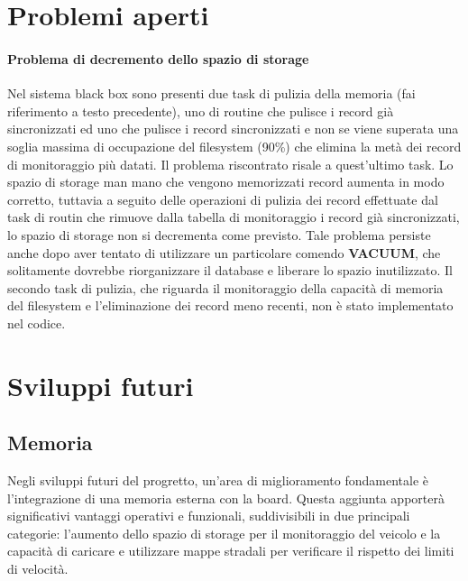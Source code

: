 \documentclass[12pt, a4paper, italian]{report}
\numberwithin{figure}{chapter}
\numberwithin{table}{chapter}
\begin{document}
\section{Problemi aperti}
\paragraph{Problema di decremento dello spazio di storage}
Nel sistema black box sono presenti due task di pulizia della memoria (fai riferimento a testo precedente), uno di routine che pulisce i record già sincronizzati ed uno che pulisce i record sincronizzati e non se viene superata una soglia massima di occupazione del filesystem (90\%) che elimina la metà dei record di monitoraggio più datati. Il problema riscontrato risale a quest'ultimo task. Lo spazio di storage man mano che vengono memorizzati record aumenta in modo corretto, tuttavia a seguito delle operazioni di pulizia dei record effettuate dal task di routin che rimuove dalla tabella di monitoraggio i record già sincronizzati, lo spazio di storage non si decrementa come previsto. Tale problema persiste anche dopo aver tentato di utilizzare un particolare comendo \textbf{VACUUM}, che solitamente dovrebbe riorganizzare il database e liberare lo spazio inutilizzato. 
Il secondo task di pulizia, che riguarda il monitoraggio della capacità di memoria del filesystem e l'eliminazione dei record meno recenti, non è stato implementato nel codice.

\section{Sviluppi futuri}
\subsection{Memoria}
Negli sviluppi futuri del progretto, un'area di miglioramento fondamentale è l'integrazione di una memoria esterna con la board. Questa aggiunta apporterà significativi vantaggi operativi e funzionali, suddivisibili in due principali categorie: l'aumento dello spazio di storage per il monitoraggio del veicolo e la capacità di caricare e utilizzare mappe stradali per verificare il rispetto dei limiti di velocità.
\end{document}
